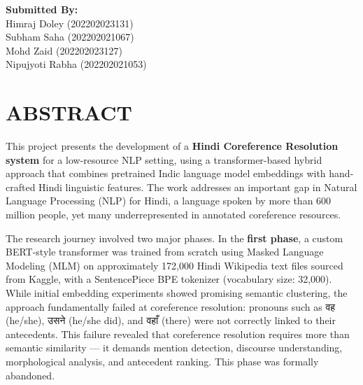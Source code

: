 \documentclass[12pt,a4paper]{report}
\begin{document}
\vspace{1cm}
\begin{flushright}
\textbf{Submitted By:}\\
Himraj Doley    (202202023131)\\
Subham Saha     (202202021067)\\
Mohd Zaid       (202202023127)\\
Nipujyoti Rabha (202202021053)
\end{flushright}


\newpage
\chapter*{\fontsize{16}{19}\selectfont ABSTRACT}

\noindent This project presents the development of a \textbf{Hindi Coreference Resolution system} for a low-resource NLP setting, using a transformer-based hybrid approach that combines pretrained Indic language model embeddings with hand-crafted Hindi linguistic features. The work addresses an important gap in Natural Language Processing (NLP) for Hindi, a language spoken by more than 600 million people, yet many underrepresented in annotated coreference resources.

\noindent The research journey involved two major phases. In the \textbf{first phase}, a custom BERT-style transformer was trained from scratch using Masked Language Modeling (MLM) on approximately 172,000 Hindi Wikipedia text files sourced from Kaggle, with a SentencePiece BPE tokenizer (vocabulary size: 32,000). While initial embedding experiments showed promising semantic clustering, the approach fundamentally failed at coreference resolution: pronouns such as {\hindifont वह} (he/she), {\hindifont उसने} (he/she did), and {\hindifont वहाँ} (there) were not correctly linked to their antecedents. This failure revealed that coreference resolution requires more than semantic similarity --- it demands mention detection, discourse understanding, morphological analysis, and antecedent ranking. This phase was formally abandoned.
\end{document}
